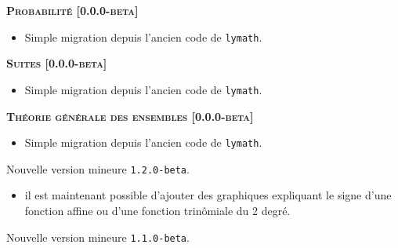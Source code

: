 \documentclass[12pt,a4paper]{book}
\begin{document}
\begin{description}


\begin{center}
    \textbf{\textsc{Probabilité [0.0.0-beta]}}
\end{center}

\begin{itemize}[itemsep=.5em]
    \item Simple migration depuis l'ancien code de \verb+lymath+.
\end{itemize}


\separation




\begin{center}
    \textbf{\textsc{Suites [0.0.0-beta]}}
\end{center}

\begin{itemize}[itemsep=.5em]
    \item Simple migration depuis l'ancien code de \verb+lymath+.
\end{itemize}


\separation




\begin{center}
    \textbf{\textsc{Théorie générale des ensembles [0.0.0-beta]}}
\end{center}

\begin{itemize}[itemsep=.5em]
    \item Simple migration depuis l'ancien code de \verb+lymath+.
\end{itemize}


\separation

\end{description}\begin{description}
\medskip
\item[2020-07-05] Nouvelle version mineure \verb+1.2.0-beta+.

\begin{itemize}[itemsep=.5em]
    \item {}
          il est maintenant possible d'ajouter des graphiques expliquant le signe d'une fonction affine ou d'une fonction trinômiale du 2\ieme{} degré.
\end{itemize}
\end{description}\begin{description}
\medskip
\item[2020-06-27] Nouvelle version mineure \verb+1.1.0-beta+.


\end{description}
\end{document}
